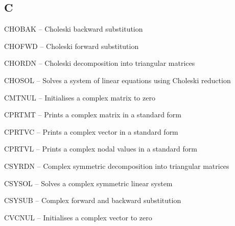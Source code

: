 \subsection*{C} %
\begin{list}{}{\leftmargin=80pt  \itemsep=0pt}
\item[CHOBAK \hfill] -- Choleski backward substitution
\item[CHOFWD \hfill] -- Choleski forward substitution
\item[CHORDN \hfill] -- Choleski decomposition into triangular matrices
\item[CHOSOL \hfill] -- Solves a system of linear equations using Choleski reduction
\item[CMTNUL \hfill] -- Initialises a complex matrix to zero
\item[CPRTMT \hfill] -- Prints a complex matrix in a standard form
\item[CPRTVC \hfill] -- Prints a complex vector in a standard form
\item[CPRTVL \hfill] -- Prints a complex nodal values in a standard form
\item[CSYRDN \hfill] -- Complex symmetric decomposition into triangular matrices
\item[CSYSOL \hfill] -- Solves a complex symmetric linear system
\item[CSYSUB \hfill] -- Complex forward and backward substitution
\item[CVCNUL \hfill] -- Initialises a complex vector to zero
\end{list}
